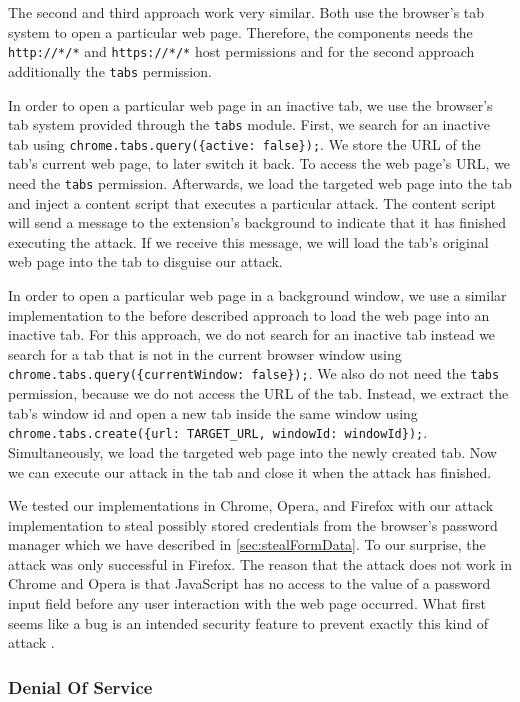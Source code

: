 	The second and third approach work very similar. Both use the browser's tab system to open a particular web page. Therefore, the components needs the \texttt{http://*/*} and \texttt{https://*/*} host permissions and for the second approach additionally the \texttt{tabs} permission.
	
	In order to open a particular web page in an inactive tab, we use the browser's tab system provided through the \texttt{tabs} module. First, we search for an inactive tab using \lstinline|chrome.tabs.query({active: false});|. We store the URL of the tab's current web page, to later switch it back. To access the web page's URL, we need the \texttt{tabs} permission. Afterwards, we load the targeted web page into the tab and inject a content script that executes a particular attack. The content script will send a message to the extension's background to indicate that it has finished executing the attack. If we receive this message, we will load the tab's original web page into the tab to disguise our attack.
	
	In order to open a particular web page in a background window, we use a similar implementation to the before described approach to load the web page into an inactive tab. For this approach, we do not search for an inactive tab instead we search for a tab that is not in the current browser window using \lstinline|chrome.tabs.query({currentWindow: false});|. We also do not need the \texttt{tabs} permission, because we do not access the URL of the tab. Instead, we extract the tab's window id and open a new tab inside the same window using \lstinline|chrome.tabs.create({url: TARGET_URL, windowId: windowId});|. Simultaneously, we load the targeted web page into the newly created tab. Now we can execute our attack in the tab and close it when the attack has finished.
	
	We tested our implementations in Chrome, Opera, and Firefox with our attack implementation to steal possibly stored credentials from the browser's password manager which we have described in \autoref{sec:stealFormData}. To our surprise, the attack was only successful in Firefox. The reason that the attack does not work in Chrome and Opera is that JavaScript has no access to the value of a password input field before any user interaction with the web page occurred. What first seems like a bug is an intended security feature to prevent exactly this kind of attack \cite{chromiumBlogPasswordInput}.


\subsubsection{Denial Of Service}
\label{sec:DoS}
	
